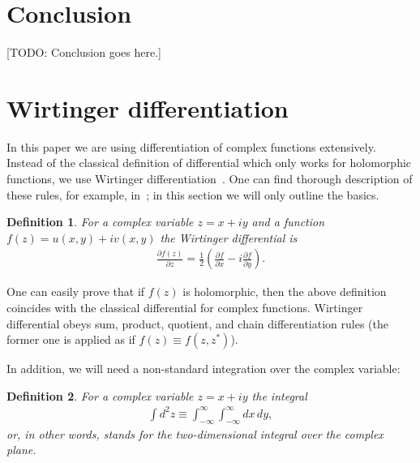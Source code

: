 \documentclass[12pt,aip,jmp,amssymb,amsmath]{revtex4-1}
\newtheorem{definition}{Definition}
\begin{document}
\section{Conclusion}

[TODO: Conclusion goes here.]


\appendix



\section{Wirtinger differentiation}

In this paper we are using differentiation of complex functions extensively.
Instead of the classical definition of differential which only works for holomorphic functions, we use Wirtinger differentiation~\cite{Wirtinger1927}.
One can find thorough description of these rules, for example, in~\cite{Kreutz-Delgado2009}; in this section we will only outline the basics.

\begin{definition}
    For a complex variable $z = x + iy$ and a function $f(z) = u(x, y) + iv(x, y)$ the Wirtinger differential is
    \begin{equation*}\begin{split}
        \frac{\partial f(z)}{\partial z}
        = \frac{1}{2} \left(
            \frac{\partial f}{\partial x} - i \frac{\partial f}{\partial y}
        \right).
    \end{split}\end{equation*}
\end{definition}

One can easily prove that if $f(z)$ is holomorphic, then the above definition coincides with the classical differential for complex functions.
Wirtinger differential obeys sum, product, quotient, and chain differentiation rules (the former one is applied as if $f(z) \equiv f(z, z^*)$).

In addition, we will need a non-standard integration over the complex variable:

\begin{definition}
    For a complex variable $z = x + iy$ the integral
    \begin{equation*}\begin{split}
        \int d^2 z \equiv \int_{-\infty}^{\infty} \int_{-\infty}^{\infty} dx\, dy,
    \end{split}\end{equation*}
    or, in other words, stands for the two-dimensional integral over the complex plane.
\end{definition}
\end{document}
